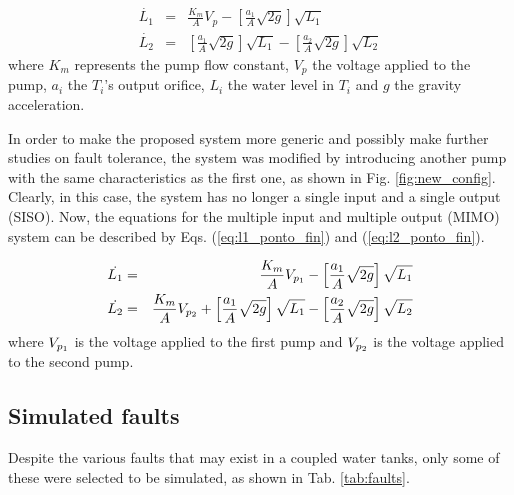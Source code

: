 \documentclass[10pt,fleqn,a4paper]{article}
\begin{document}
\begin{eqnarray}
\dot{L_1} & = & \frac{K_m}{A}V_p -
                \left[\frac{a_1}{A}\sqrt{2g}\right]\sqrt{L_1}
                \label{eq:l1_ponto}\\
\dot{L_2} & = & \left[\frac{a_1}{A}\sqrt{2g}\right]\sqrt{L_1} -
                \left[\frac{a_2}{A}\sqrt{2g}\right]\sqrt{L_2}
                \label{eq:l2_ponto}
\end{eqnarray}
%
where $K_m$ represents the pump flow constant, $V_p$ the voltage applied to the
pump, $a_i$ the $T_i$'s output orifice, $L_i$ the water level in $T_i$ and $g$
the gravity acceleration.

In order to make the proposed system more generic and possibly make further
studies on fault tolerance, the system was modified by introducing another pump
with the same characteristics as the first one, as shown in Fig.
\ref{fig:new_config}. Clearly, in this case, the system has no longer a single
input and a single output (SISO). Now, the equations for the multiple input and
multiple output (MIMO) system can be described by Eqs. (\ref{eq:l1_ponto_fin})
and (\ref{eq:l2_ponto_fin}).

\begin{eqnarray}
\dot{L_1} & = & \frac{K_m}{A}V_{p_{\tiny 1}} -
                \left[\frac{a_1}{A}\sqrt{2g}\right]\sqrt{L_1}
                \label{eq:l1_ponto_fin}\\
\dot{L_2} & = & \frac{K_m}{A}V_{p_{\tiny 2}} +
                \left[\frac{a_1}{A}\sqrt{2g}\right]\sqrt{L_1} -
                \left[\frac{a_2}{A}\sqrt{2g}\right]\sqrt{L_2}
                \label{eq:l2_ponto_fin}
\end{eqnarray}
%
where $V_{p_{\tiny 1}}$ is the voltage applied to the first pump and
$V_{p_{\tiny 2}}$ is the voltage applied to the second pump.

\subsection{Simulated faults}
Despite the various faults that may exist in a coupled water tanks, only some of
these were selected to be simulated, as shown in Tab. \ref{tab:faults}.
\end{document}
